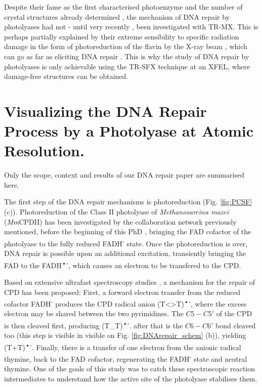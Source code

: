 Despite their fame as the first characterised photoenzyme and the number of crystal structures already determined \parencite{mullerStructuralBiologyDNA2009}, the mechanism of DNA repair by photolyases had not - until very recently \parencite{maestre-reynaVisualizingDNARepair2023a, christouTimeresolvedCrystallographyCaptures2023a}, been investigated with TR-MX. This is perhaps partially explained by their extreme sensibility to specific radiation damage in the form of photoreduction of the flavin by the X-ray beam \parencite{kortDNAApophotolyaseAnacystis2004}, which can go as far as eliciting DNA repair \parencite{meesCrystalStructurePhotolyase2004}.  This is why the study of DNA repair by photolyases is only achievable using the TR-SFX technique at an XFEL, where damage-free structures can be obtained. 

\section{Visualizing the DNA Repair Process by a Photolyase at Atomic Resolution.}\label{sec:prior_MmCPDII}
Only the scope, context and results of our DNA repair paper are summarised here.

The first step of the DNA repair mechanisms is photoreduction (Fig. \ref{fig:PCSF} (c)). Photoreduction of the Class II photolyase of \textit{Methanosarcina mazei} (\textit{Mm}CPDII) has been investigated by the collaboration network previously mentioned, before the beginning of this PhD \parencite{maestre-reynaSerialCrystallographyCaptures2022}, bringing the FAD cofactor of the photolyase to the fully reduced  FADH\textsuperscript{-} state. Once the photoreduction is over, DNA repair is possible upon an additional excitation, transiently bringing the FAD to the FADH\textsuperscript{•-}, which causes an electron to be transfered to the CPD. 

Based on extensive ultrafast spectroscopy studies \parencite{zhangPhotolyaseDynamicsElectrontransfer2017}, a mechanism for the repair of CPD has been proposed: First, a forward electron transfer from the reduced cofactor FADH\textsuperscript{-} produces the CPD radical anion (T<>T)\textsuperscript{•-}, where the excess electron may be shared between the two pyrimidines. The \(C5-C5'\) of the CPD is then cleaved first, producing (T\_T)\textsuperscript{•-}. after that is the \(C6-C6'\) bond cleaved too (this step is visible in visible on Fig. \ref{fig:DNArepair_schem} (b)), yielding (T+T)\textsuperscript{•-}. Finally, there is a transfer of one electron from the anionic radical thymine, back to the FAD cofactor, regenerating the FADH\textsuperscript{-} state and neutral thymine. One of the goals of this study was to catch these spectroscopic reaction intermediates to understand how the active site of the photolyase stabilises them. 

